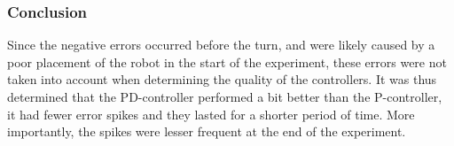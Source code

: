 \subsubsection{Conclusion}
Since the negative errors occurred before the turn, and were likely caused by a poor placement of the robot in the start of the experiment, these errors were not taken into account when determining the quality of the controllers. It was thus determined that the PD-controller performed a bit better than the P-controller, it had fewer error spikes and they lasted for a shorter period of time. More importantly, the spikes were lesser frequent at the end of the experiment.
